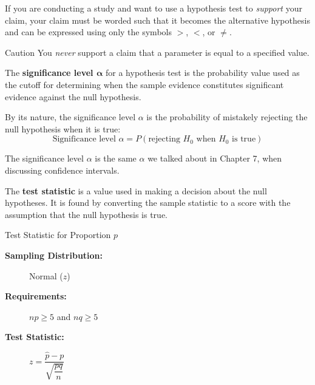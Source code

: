 \documentclass{beamer}
\newcommand{\prob}[1]{P\left(#1\right)}
\begin{document}
\begin{frame}
\begin{note}
If you are conducting a study and want to use a hypothesis test to \emph{support} your claim, your claim must be worded such that it becomes the alternative hypothesis and can be expressed using only the symbols $>$, $<$, or $\neq$.
\end{note}\pause

\begin{block}{Caution}
You \emph{never} support a claim that a parameter is equal to a specified value.
\end{block}
\end{frame}

\begin{frame}
\begin{definition}
The \textbf{significance level $\boldsymbol{\alpha}$} for a hypothesis test is the probability value used as the cutoff for determining when the sample evidence constitutes significant evidence against the null hypothesis. 
\end{definition}\pause

\begin{note}
By its nature, the significance level $\alpha$ is the probability of mistakely rejecting the null hypothesis when it is true:
\begin{equation*}
\text{Significance level $\alpha$} = \prob{\text{rejecting $H_0$ when $H_0$ is true}}
\end{equation*}
\end{note}\pause

\begin{note}
The significance level $\alpha$ is the same $\alpha$ we talked about in Chapter 7, when discussing confidence intervals.
\end{note}
\end{frame}

\begin{frame}
\begin{definition}
The \textbf{test statistic} is a value used in making a decision about the null hypotheses. It is found by converting the sample statistic to a score with the assumption that the null hypothesis is true.
\end{definition}\pause

\begin{block}{Test Statistic for Proportion $p$}
\begin{description}
\item[\textbf{Sampling Distribution:}] Normal ($z$)
\item[\textbf{Requirements:}] $np\geq5$ and $nq\geq5$
\item[\textbf{Test Statistic:}] $z=\dfrac{\hat{p}-p}{\sqrt{\dfrac{pq}{n}}}$
\end{description}
\end{block}
\end{frame}
\end{document}
